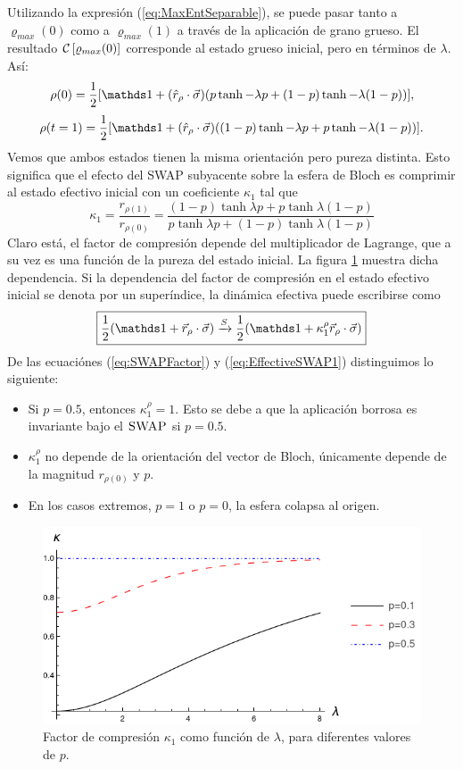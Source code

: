 Utilizando la expresión (\ref{eq:MaxEntSeparable}), se puede pasar tanto a $\varrho_{max}(0)$ como a $\varrho_{max}(1)$ a través de la aplicación de grano grueso. El resultado $\mathcal{C}\left[\varrho_{max}(0)\right]$ corresponde al estado grueso inicial, pero en términos de $\lambda$. Así:
\begin{equation}
\rho(0)=\frac{1}{2}[\Id+(\hat{r}_{\rho}\cdot\vec{\sigma})(p\tanh{-\lambda p}+(1-p)\tanh{-\lambda (1-p)})],
\end{equation}
\begin{equation}
\rho(t=1)=\frac{1}{2}[\Id+(\hat{r}_{\rho}\cdot\vec{\sigma})((1-p)\tanh{-\lambda p}+p\tanh{-\lambda (1-p)})].
\end{equation}
Vemos que ambos estados tienen la misma orientación pero pureza distinta. Esto significa que el efecto del \textsc{SWAP} subyacente sobre la esfera de Bloch es comprimir al estado efectivo inicial con un coeficiente $\kappa_{1}$ tal que
\begin{equation}\label{eq:SWAPFactor}
  \kappa_{1}=\frac{r_{\rho(1)}}{r_{\rho(0)}}=\frac{(1-p)\tanh{\lambda p}+p\tanh{\lambda (1-p)}}{
    p\tanh{\lambda p}+(1-p)\tanh{\lambda (1-p)}}
\end{equation}
Claro está, el factor de compresión depende del multiplicador de Lagrange, que a su vez es una función de la pureza del estado inicial. La figura \ref{fig:SWAPFactor2D} muestra dicha dependencia. Si la dependencia del factor de compresión en el estado efectivo inicial se denota por un superíndice, la dinámica efectiva puede escribirse como
\begin{equation}\label{eq:EffectiveSWAP1}
  \boxed{\frac{1}{2}(\Id+\vec{r}_{\rho}\cdot\vec{\sigma}) \xrightarrow{S} \frac{1}{2}(\Id+\kappa_{1}^{\rho}\vec{r}_{\rho}\cdot\vec{\sigma})}
\end{equation}
De las ecuaciónes (\ref{eq:SWAPFactor}) y (\ref{eq:EffectiveSWAP1}) distinguimos lo siguiente:
\begin{itemize}
  \item Si $p=0.5$, entonces $\kappa_{1}^{\rho}=1$. Esto se debe a que la aplicación borrosa es invariante bajo el $\textsc{SWAP}$ si $p=0.5$.
  \item $\kappa_{1}^{\rho}$ no depende de la orientación del vector de Bloch, únicamente depende de la magnitud $r_{\rho(0)}$ y $p$.
  \item En los casos extremos, $p=1$ o $p=0$, la esfera colapsa al origen.
\end{itemize}

\begin{figure}[h!]
  \centering
  \includegraphics[width=0.6\linewidth]{chapter3/figures/ContractionFactorSWAP_2D_lambda0to8.png}
  \caption{Factor de compresión $\kappa_{1}$ como función de $\lambda$, para diferentes valores de $p$.}
  \label{fig:SWAPFactor2D}
\end{figure}

